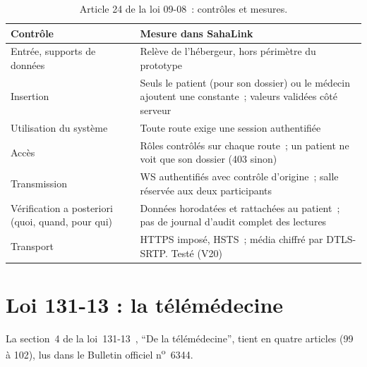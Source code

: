 \begin{table}[H]
\centering
\caption{Article 24 de la loi 09-08~: contrôles et mesures.}
\label{tab:art24}
\small
\begin{tabularx}{\textwidth}{@{}l X@{}}
\toprule
\textbf{Contrôle} & \textbf{Mesure dans SahaLink} \\
\midrule
Entrée, supports de données & Relève de l'hébergeur, hors périmètre du prototype \\
Insertion & Seuls le patient (pour son dossier) ou le médecin ajoutent une constante~; valeurs validées côté serveur \\
Utilisation du système & Toute route exige une session authentifiée \\
Accès & Rôles contrôlés sur chaque route~; un patient ne voit que son dossier (403 sinon) \\
Transmission & \ac{WS} authentifiés avec contrôle d'origine~; salle réservée aux deux participants \\
Vérification a posteriori (quoi, quand, pour qui) & Données horodatées et rattachées au patient~; pas de journal d'audit complet des lectures \\
Transport & \ac{HTTPS} imposé, \ac{HSTS}~; média chiffré par \ac{DTLS}-\ac{SRTP}. Testé (V20) \\
\bottomrule
\end{tabularx}
\end{table}

\section{Loi 131-13 : la télémédecine}

La section~4 de la loi~131-13~\cite{loi13113}, \enquote{De la télémédecine}, tient en quatre articles (99 à 102), lus dans le Bulletin officiel n\textsuperscript{o}~6344.

